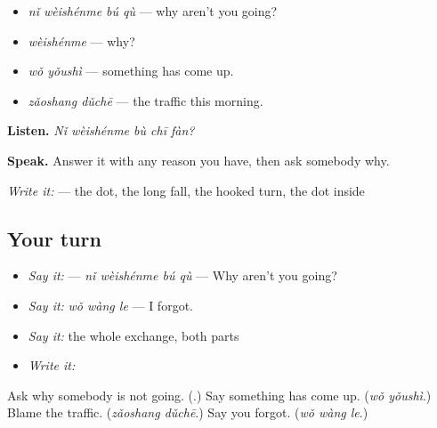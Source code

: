 \begin{grammarlens}[title={What you've built — asking why}]
\begin{itemize}
\raggedright
  \item \textbf{} \emph{nǐ wèishénme bú qù} — why aren't you going?
  \item \textbf{} \emph{wèishénme} — why?
  \item \emph{wǒ yǒushì} — something has come up.
  \item \emph{zǎoshang dǔchē} — the traffic this morning.
\end{itemize}

\textbf{Listen.} \emph{Nǐ wèishénme bù chī fàn?}

\textbf{Speak.} Answer it with any reason you have, then ask somebody why.

\emph{Write it:}  — the dot, the long fall, the hooked turn, the dot inside
\end{grammarlens}

\subsection*{Your turn}
\begin{itemize}
\raggedright
  \item \emph{Say it:}  — \emph{nǐ wèishénme bú qù} — Why aren't you going?
  \item \emph{Say it:} \emph{wǒ wàng le} — I forgot.
  \item \emph{Say it:} the whole exchange, both parts
  \item \emph{Write it:} 
\end{itemize}

\begin{tcolorbox}[breakable,colback=teal!4,colframe=teal!35!black,title={Before you move on}]
Ask why somebody is not going. (\textbf{}.) Say something has come up. (\emph{wǒ yǒushì}.) Blame the traffic. (\emph{zǎoshang dǔchē}.) Say you forgot. (\emph{wǒ wàng le}.)
\end{tcolorbox}
